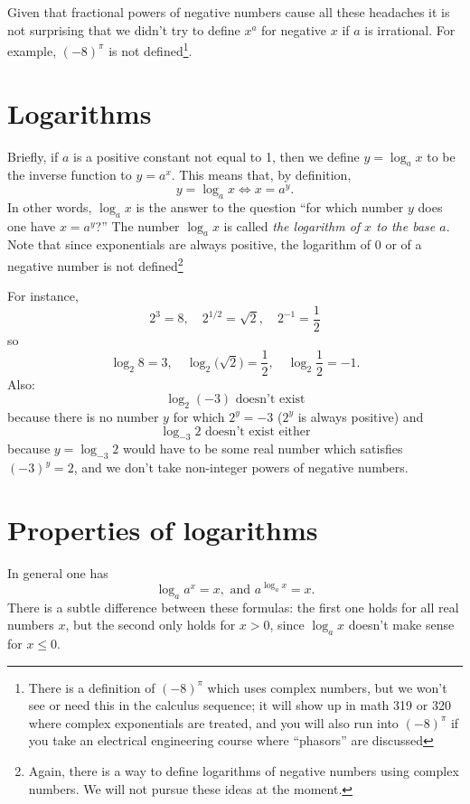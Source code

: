 Given that fractional powers of negative numbers cause all these
headaches it is not surprising that we didn't try to define $x^a$ for
negative $x$ if $a$ is irrational.  For example, $(-8)^\pi$ is not
defined\footnote{There is a definition of $(-8)^\pi$ which uses complex
numbers, but we won't see or need this in the calculus sequence; it
will show up in math 319 or 320 where complex exponentials are
treated, and you will also run into $(-8)^\pi$ if you take an
electrical engineering course where ``phasors'' are discussed}.



\section{Logarithms} %
Briefly, if $a$ is a positive constant not equal to 1, then we define $y=\log_a
x$ to be the inverse function to $y=a^x$. This means that, by definition,
\[
y=\log_a x \iff x=a^y.
\]
In other words, $\log_a x$ is the answer to the question ``for which number $y$
does one have $x=a^y$?''  The number $\log_a x$ is called \emph{the logarithm of
$x$ to the base $a$}.  Note that since exponentials are always positive, the
logarithm of 0 or of a negative number is not defined\footnote{Again, there is a
way to define logarithms of negative numbers using complex numbers. We will not
pursue these ideas at the moment.}


For instance,
\[
2^3 = 8, \quad
2^{1/2} = \sqrt2,\quad
2^{-1}= \frac12
\]
so
\[
\log_2 8 = 3,\quad
\log_2\bigl(\sqrt{2}\bigr) = \frac12,\quad
\log_2 \frac12 = -1.
\]
Also:
\[
\log_2 (-3) \text{ doesn't exist}
\]
because there is no number $y$ for which $2^y = -3$ ($2^y$ is always positive)
and
\[
\log_{-3}2 \text{ doesn't exist either}
\]
because $y=\log_{-3}2$ would have to be some real number which satisfies $(-3)^y
= 2$, and we don't take non-integer powers of negative numbers.






\section{Properties of logarithms} %
In general one has
\[
\log_a a^x = x,  \text{ and }  a^{\log_a x}=x.
\]
There is a subtle difference between these formulas: the first one holds for all
real numbers $x$, but the second only holds for $x>0$, since $\log _a x$ doesn't
make sense for $x\leq 0$.




